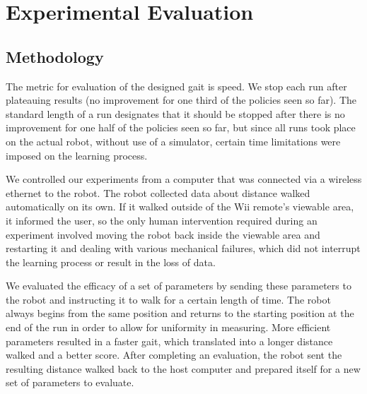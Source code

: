 \section{Experimental Evaluation}

\subsection{Methodology}

The metric for evaluation of the designed gait is speed. We stop each 
run after plateauing results (no improvement for one third of the 
policies seen so far). The standard length of a run designates that it
should be stopped after there is no improvement for one half of the policies
seen so far, but since all runs took place on the actual robot, without use
of a simulator, certain time limitations were imposed on the learning process.

We controlled our experiments from a computer that was connected via a 
wireless ethernet to the robot. The robot collected data about distance
walked automatically on its own. If it walked outside of the Wii remote's
viewable area, it informed the user, so the only human intervention
required during an experiment involved moving the robot back inside the 
viewable area and restarting it and dealing with various mechanical failures,
which did not interrupt the learning process or result in the loss of data.

We evaluated the efficacy of a set of parameters by sending these
parameters to the robot and instructing it to walk for a certain length
of time. The robot always begins from the same position and returns to the
starting position at the end of the run in order to allow for uniformity
in measuring. More efficient parameters resulted in a faster gait, which
translated into a longer distance walked and a better score. After completing
an evaluation, the robot sent the resulting distance walked back to the
host computer and prepared itself for a new set of parameters to evaluate.

